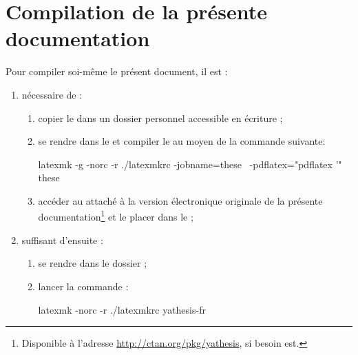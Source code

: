 \chapter{Compilation de la présente documentation}\label{cha-comp-de-la-pres}

%

Pour compiler soi-même le présent document, il est :
\begin{enumerate}
\item nécessaire de :
  \begin{enumerate}
  \item copier le  dans un
    dossier personnel accessible en écriture ;
  \item se rendre dans le  et compiler
    le  au moyen de la commande suivante\uneseuleligne :
\begin{listingshell}[before=\smallskip]
latexmk -g -norc -r ./latexmkrc -jobname=these \
-pdflatex="pdflatex %
\AtEndPreamble{\RequirePackage{yathesis-demo}} '" these
\end{listingshell}
%
\item accéder au  attaché à la version électronique
  originale de la présente documentation\footnote{Disponible à l'adresse
    \url{http://ctan.org/pkg/yathesis}, si besoin est.} et le placer dans le
  \Folder{../exemples} ;
\end{enumerate}
\item suffisant d'ensuite :
  \begin{enumerate}
  \item se rendre dans le dossier  ;
  \item lancer la commande :
%
\begin{listingshell}[before=\medskip]
latexmk -norc -r ./latexmkrc yathesis-fr
\end{listingshell}
%
  \end{enumerate}
\end{enumerate}

